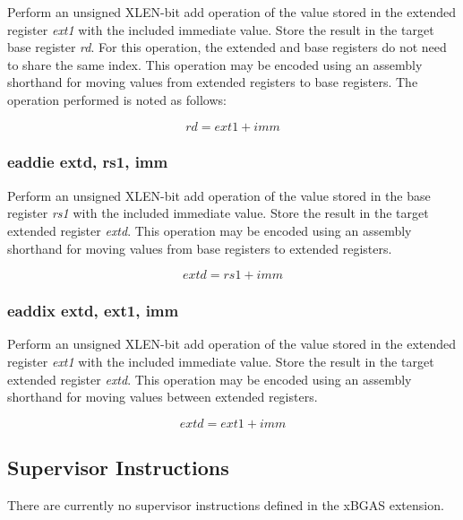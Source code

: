 \documentclass{article}
\begin{document}
Perform an unsigned XLEN-bit add operation of the value stored in the extended 
register \textit{ext1} with the included immediate value.  Store the result 
in the target base register \textit{rd}.  For this operation, the extended and base registers 
do not need to share the same index.  This operation may be encoded 
using an assembly shorthand for moving values from extended registers 
to base registers.  The operation performed is noted as follows:

\begin{equation}
rd = ext1 + imm
\end{equation}

\subsubsection{eaddie extd, rs1, imm}

Perform an unsigned XLEN-bit add operation of the value stored in the base 
register \textit{rs1} with the included immediate value.  Store the result in the 
target extended register \textit{extd}.  This operation may be encoded 
using an assembly shorthand for moving values from base registers 
to extended registers.

\begin{equation}
extd = rs1 + imm
\end{equation}

\subsubsection{eaddix extd, ext1, imm}

Perform an unsigned XLEN-bit add operation of the value stored in the extended
register \textit{ext1} with the included immediate value.  Store the result in the 
target extended register \textit{extd}.  This operation may be encoded using 
an assembly shorthand for moving values between extended registers.  

\begin{equation}
extd = ext1 + imm
\end{equation}

\subsection{Supervisor Instructions}

There are currently no supervisor instructions defined in the xBGAS extension.  

\newpage
\end{document}
